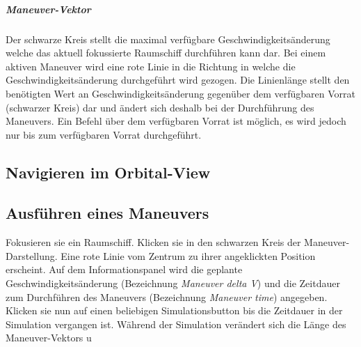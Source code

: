 \subparagraph{Maneuver-Vektor}
Der schwarze Kreis stellt die maximal verfügbare Geschwindigkeitsänderung welche das aktuell fokussierte Raumschiff durchführen kann dar. Bei einem aktiven Maneuver wird eine rote Linie in die Richtung in welche die Geschwindigkeitsänderung durchgeführt wird gezogen. Die Linienlänge stellt den benötigten Wert an Geschwindigkeitsänderung gegenüber dem verfügbaren Vorrat (schwarzer Kreis) dar und ändert sich deshalb bei der Durchführung des Maneuvers. Ein Befehl über dem verfügbaren Vorrat ist möglich, es wird jedoch nur bis zum verfügbaren Vorrat durchgeführt.

\subsection{Navigieren im Orbital-View}


\subsection{Ausführen eines Maneuvers}
Fokusieren sie ein Raumschiff.
Klicken sie in den schwarzen Kreis der Maneuver-Darstellung.
Eine rote Linie vom Zentrum zu ihrer angeklickten Position erscheint.
Auf dem Informationspanel wird die geplante Geschwindigkeitsänderung (Bezeichnung \emph{Maneuver delta V}) und die Zeitdauer zum Durchführen des Maneuvers (Bezeichnung \emph{Maneuver time}) angegeben.\\
Klicken sie nun auf einen beliebigen Simulationsbutton bis die Zeitdauer in der Simulation vergangen ist.
Während der Simulation verändert sich die Länge des Maneuver-Vektors u
